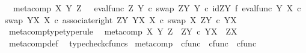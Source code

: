 \begin{isabellebody}
\ \ {\isachardoublequoteopen}meta{\isacharunderscore}{\kern0pt}comp\ X\ Y\ Z\ \ {\isacharequal}{\kern0pt}\ {\isacharparenleft}{\kern0pt}eval{\isacharunderscore}{\kern0pt}func\ Z\ Y\ {\isasymcirc}\isactrlsub c\ swap\ {\isacharparenleft}{\kern0pt}Z\isactrlbsup Y\isactrlesup {\isacharparenright}{\kern0pt}\ Y\ {\isasymcirc}\isactrlsub c\ {\isacharparenleft}{\kern0pt}id{\isacharparenleft}{\kern0pt}Z\isactrlbsup Y\isactrlesup {\isacharparenright}{\kern0pt}\ {\isasymtimes}\isactrlsub f\ {\isacharparenleft}{\kern0pt}eval{\isacharunderscore}{\kern0pt}func\ Y\ X\ {\isasymcirc}\isactrlsub c\ swap\ {\isacharparenleft}{\kern0pt}Y\isactrlbsup X\isactrlesup {\isacharparenright}{\kern0pt}\ X{\isacharparenright}{\kern0pt}{\isacharparenright}{\kern0pt}\ {\isasymcirc}\isactrlsub c\ {\isacharparenleft}{\kern0pt}associate{\isacharunderscore}{\kern0pt}right\ {\isacharparenleft}{\kern0pt}Z\isactrlbsup Y\isactrlesup {\isacharparenright}{\kern0pt}\ {\isacharparenleft}{\kern0pt}Y\isactrlbsup X\isactrlesup {\isacharparenright}{\kern0pt}\ X{\isacharparenright}{\kern0pt}\ {\isasymcirc}\isactrlsub c\ swap\ X\ {\isacharparenleft}{\kern0pt}{\isacharparenleft}{\kern0pt}Z\isactrlbsup Y\isactrlesup {\isacharparenright}{\kern0pt}\ {\isasymtimes}\isactrlsub c\ {\isacharparenleft}{\kern0pt}Y\isactrlbsup X\isactrlesup {\isacharparenright}{\kern0pt}{\isacharparenright}{\kern0pt}{\isacharparenright}{\kern0pt}\isactrlsup {\isasymsharp}{\isachardoublequoteclose}\isanewline
\isanewline
{}\isamarkupfalse%
\ meta{\isacharunderscore}{\kern0pt}comp{\isacharunderscore}{\kern0pt}type{\isacharbrackleft}{\kern0pt}type{\isacharunderscore}{\kern0pt}rule{\isacharbrackright}{\kern0pt}{\isacharcolon}{\kern0pt}\isanewline
\ \ {\isachardoublequoteopen}meta{\isacharunderscore}{\kern0pt}comp\ X\ Y\ Z\ {\isacharcolon}{\kern0pt}\ Z\isactrlbsup Y\isactrlesup \ {\isasymtimes}\isactrlsub c\ Y\isactrlbsup X\isactrlesup \ {\isasymrightarrow}\ Z\isactrlbsup X\isactrlesup {\isachardoublequoteclose}\isanewline
%
\isadelimproof
\ \ %
\endisadelimproof
%
\isatagproof
{}\isamarkupfalse%
\ meta{\isacharunderscore}{\kern0pt}comp{\isacharunderscore}{\kern0pt}def\ \isamarkupfalse%
\ typecheck{\isacharunderscore}{\kern0pt}cfuncs%
\endisatagproof
{\isafoldproof}%
%
\isadelimproof
\isanewline
%
\endisadelimproof
\isanewline
{}\isamarkupfalse%
\ meta{\isacharunderscore}{\kern0pt}comp{}\ {\isacharcolon}{\kern0pt}{\isacharcolon}{\kern0pt}\ {\isachardoublequoteopen}cfunc\ {\isasymRightarrow}\ cfunc\ {\isasymRightarrow}\ cfunc{\isachardoublequoteclose}\ {\isacharparenleft}{\kern0pt}\ {\isachardoublequoteopen}{\isasymbox}{\isachardoublequoteclose}\ {}{}{\isacharparenright}{\kern0pt}\isanewline

\end{isabellebody}
